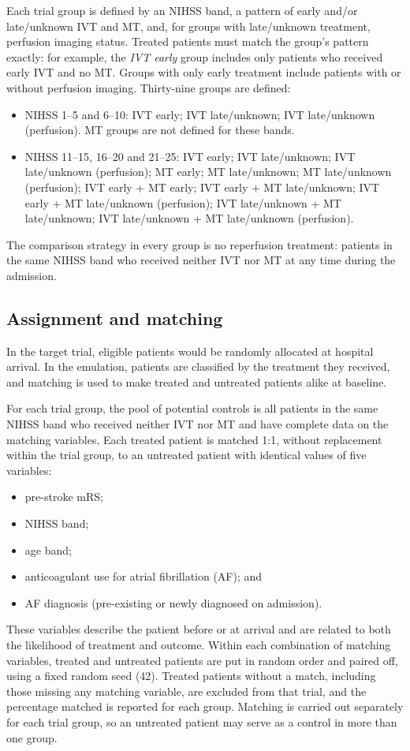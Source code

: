 Each trial group is defined by an NIHSS band, a pattern of early and/or late/unknown IVT and MT, and, for groups with late/unknown treatment, perfusion imaging status. Treated patients must match the group's pattern exactly: for example, the \textit{IVT early} group includes only patients who received early IVT and no MT. Groups with only early treatment include patients with or without perfusion imaging. Thirty-nine groups are defined:
\begin{itemize}
\item NIHSS 1--5 and 6--10: IVT early; IVT late/unknown; IVT late/unknown (perfusion). MT groups are not defined for these bands.
\item NIHSS 11--15, 16--20 and 21--25: IVT early; IVT late/unknown; IVT late/unknown (perfusion); MT early; MT late/unknown; MT late/unknown (perfusion); IVT early + MT early; IVT early + MT late/unknown; IVT early + MT late/unknown (perfusion); IVT late/unknown + MT late/unknown; IVT late/unknown + MT late/unknown (perfusion).
\end{itemize}
The comparison strategy in every group is no reperfusion treatment: patients in the same NIHSS band who received neither IVT nor MT at any time during the admission.

\subsection{Assignment and matching}

In the target trial, eligible patients would be randomly allocated at hospital arrival. In the emulation, patients are classified by the treatment they received, and matching is used to make treated and untreated patients alike at baseline.

For each trial group, the pool of potential controls is all patients in the same NIHSS band who received neither IVT nor MT and have complete data on the matching variables. Each treated patient is matched 1:1, without replacement within the trial group, to an untreated patient with identical values of five variables\cite{stuart_matching_2010}:
\begin{itemize}
\item pre-stroke mRS;
\item NIHSS band;
\item age band;
\item anticoagulant use for atrial fibrillation (AF); and
\item AF diagnosis (pre-existing or newly diagnosed on admission).
\end{itemize}
These variables describe the patient before or at arrival and are related to both the likelihood of treatment and outcome. Within each combination of matching variables, treated and untreated patients are put in random order and paired off, using a fixed random seed (42). Treated patients without a match, including those missing any matching variable, are excluded from that trial, and the percentage matched is reported for each group. Matching is carried out separately for each trial group, so an untreated patient may serve as a control in more than one group.

